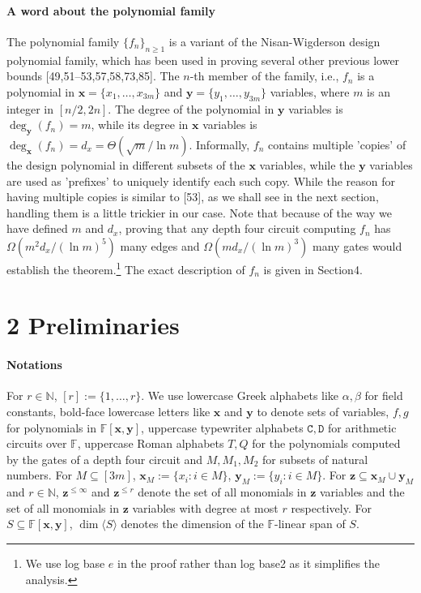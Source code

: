 \documentclass[10pt,a4paper]{article}
\begin{document}
\paragraph{A word about the polynomial family}
The polynomial family $\{f_n\}_{n\ge1}$ is a variant of the Nisan-Wigderson design polynomial family, which has been used in proving several other previous lower bounds [49,51–53,57,58,73,85]. The $n$-th member of the family, i.e., $f_n$ is a polynomial in $\mathbf x=\{x_1,\ldots,x_{3m}\}$ and $\mathbf y=\{y_1,\ldots,y_{3m}\}$ variables, where $m$ is an integer in $[n/2,2n]$. The degree of the polynomial in $\mathbf y$ variables is $\deg_{\mathbf y}(f_n)=m$, while its degree in $\mathbf x$ variables is $\deg_{\mathbf x}(f_n)=d_x=\Theta(\sqrt m/\ln m)$. Informally, $f_n$ contains multiple 'copies' of the design polynomial in different subsets of the $\mathbf x$ variables, while the $\mathbf y$ variables are used as 'prefixes' to uniquely identify each such copy. While the reason for having multiple copies is similar to [53], as we shall see in the next section, handling them is a little trickier in our case. Note that because of the way we have defined $m$ and $d_x$, proving that any depth four circuit computing $f_n$ has $\Omega(m^2d_x/(\ln m)^5)$ many edges and $\Omega(md_x/(\ln m)^3)$ many gates would establish the theorem.\footnote{We use log base $e$ in the proof rather than log base2 as it simplifies the analysis.} The exact description of $f_n$ is given in Section4.

\section*{2 Preliminaries}
\paragraph{Notations}
For $r\in\mathbb N$, $[r]:=\{1,\ldots,r\}$. We use lowercase Greek alphabets like $\alpha,\beta$ for field constants, bold-face lowercase letters like $\mathbf x$ and $\mathbf y$ to denote sets of variables, $f,g$ for polynomials in $\mathbb F[\mathbf x,\mathbf y]$, uppercase typewriter alphabets $\mathtt C,\mathtt D$ for arithmetic circuits over $\mathbb F$, uppercase Roman alphabets $T,Q$ for the polynomials computed by the gates of a depth four circuit and $M,M_1,M_2$ for subsets of natural numbers. For $M\subseteq[3m]$, $\mathbf x_M:=\{x_i:i\in M\}$, $\mathbf y_M:=\{y_i:i\in M\}$. For $\mathbf z\subseteq\mathbf x_M\cup\mathbf y_M$ and $r\in\mathbb N$, $\mathbf z^{\le\infty}$ and $\mathbf z^{\le r}$ denote the set of all monomials in $\mathbf z$ variables and the set of all monomials in $\mathbf z$ variables with degree at most $r$ respectively. For $S\subseteq\mathbb F[\mathbf x,\mathbf y]$, $\dim\langle S\rangle$ denotes the dimension of the $\mathbb F$-linear span of $S$.
\end{document}

